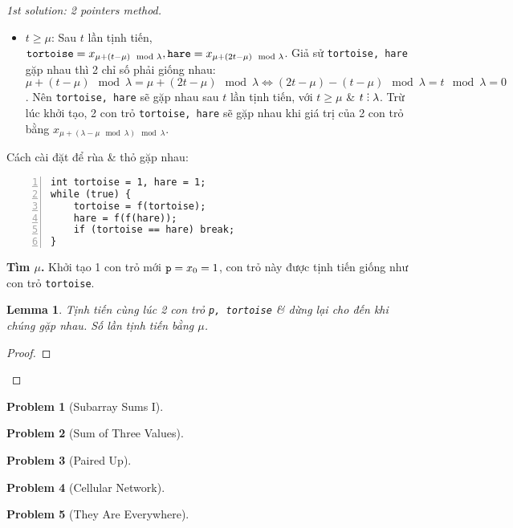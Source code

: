 \documentclass{article}
\newtheorem{lemma}{Lemma}
\newtheorem{problem}{Problem}
\DeclareRobustCommand{\divby}{%
    \mathrel{\vbox{\baselineskip.65ex\lineskiplimit0pt\hbox{.}\hbox{.}\hbox{.}}}%
}
\begin{document}
\begin{proof}[1st solution: 2 pointers method]
\begin{itemize}
         \item $t\ge\mu$: Sau $t$ lần tịnh tiến, ${\tt tortoise} = x_{\mu + (t - \mu)\mod\lambda},{\tt hare} = x_{\mu + (2t - \mu)\mod\lambda}$. Giả sử {\tt tortoise, hare} gặp nhau thì 2 chỉ số phải giống nhau: $\mu + (t - \mu)\mod\lambda = \mu + (2t - \mu)\mod\lambda\Leftrightarrow(2t - \mu) - (t - \mu)\mod\lambda = t\mod\lambda = 0$. Nên {\tt tortoise, hare} sẽ gặp nhau sau $t$ lần tịnh tiến, với $t\ge\mu$ \& $t\divby\lambda$. Trừ lúc khởi tạo, 2 con trỏ {\tt tortoise, hare} sẽ gặp nhau khi giá trị của 2 con trỏ bằng $x_{\mu + (\lambda - \mu\mod\lambda)\mod\lambda}$.
     \end{itemize}
     Cách cài đặt để rùa \& thỏ gặp nhau:
     \begin{Verbatim}[numbers=left,xleftmargin=5mm]
int tortoise = 1, hare = 1;
while (true) {
    tortoise = f(tortoise);
    hare = f(f(hare));
    if (tortoise == hare) break;
}
     \end{Verbatim}
     {\bf Tìm $\mu$.} Khởi tạo 1 con trỏ mới ${\tt p} = x_0 = 1$, con trỏ này được tịnh tiến giống như con trỏ {\tt tortoise}.

     \begin{lemma}
         Tịnh tiến cùng lúc 2 con trỏ {\tt p, tortoise} \& dừng lại cho đến khi chúng gặp nhau. Số lần tịnh tiến bằng $\mu$.
     \end{lemma}

     \begin{proof}

     \end{proof}
\end{proof}

\begin{problem}[Subarray Sums I]

\end{problem}

\begin{problem}[Sum of Three Values]

\end{problem}

\begin{problem}[Paired Up]

\end{problem}

\begin{problem}[Cellular Network]

\end{problem}

\begin{problem}[They Are Everywhere]

\end{problem}
\end{document}
